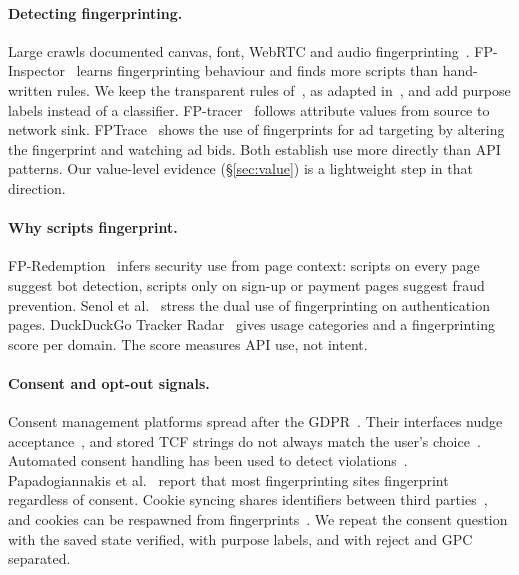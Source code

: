 \documentclass[sigconf,review,anonymous]{acmart}
\begin{document}
\paragraph{Detecting fingerprinting.} Large crawls documented canvas, font, WebRTC and audio
fingerprinting~\cite{acar2013fpdetective,acar2014web,englehardt2016online}.
FP-Inspector~\cite{iqbal2021fingerprinting} learns fingerprinting behaviour and finds more
scripts than hand-written rules. We keep the transparent rules of~\cite{englehardt2016online},
as adapted in~\cite{iqbal2021fingerprinting}, and add purpose labels instead of a classifier.
FP-tracer~\cite{boussaha2024fptracer} follows attribute values from source to network sink.
FPTrace~\cite{liu2025fptrace} shows the use of fingerprints for ad targeting by altering the
fingerprint and watching ad bids. Both establish use more directly than API patterns. Our
value-level evidence (\S\ref{sec:value}) is a lightweight step in that direction.

\paragraph{Why scripts fingerprint.} FP-Redemption~\cite{durey2021fpredemption} infers security
use from page context: scripts on every page suggest bot detection, scripts only on sign-up or
payment pages suggest fraud prevention. Senol et al.~\cite{senol2024doubleedged} stress the
dual use of fingerprinting on authentication pages. DuckDuckGo Tracker
Radar~\cite{trackerradar} gives usage categories and a fingerprinting score per domain. The
score measures API use, not intent.

\paragraph{Consent and opt-out signals.} Consent management platforms spread after the
GDPR~\cite{hils2020cmp}. Their interfaces nudge acceptance~\cite{nouwens2020dark,utz2019consent},
and stored TCF strings do not always match the user's choice~\cite{matte2020cookie}. Automated
consent handling has been used to detect violations~\cite{bollinger2022cookieblock}.
Papadogiannakis et al.~\cite{papadogiannakis2021postcookie} report that most fingerprinting
sites fingerprint regardless of consent. Cookie syncing shares identifiers between third
parties~\cite{acar2014web,papadopoulos2019cookiesync}, and cookies can be respawned from
fingerprints~\cite{fouad2022phoenix}. We repeat the consent question with the saved state
verified, with purpose labels, and with reject and GPC separated.
\end{document}
